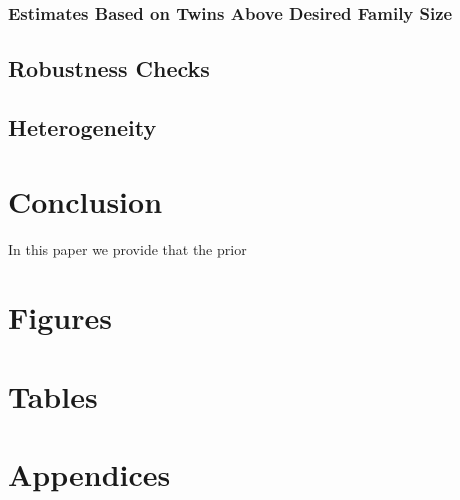 \documentclass{article}[12pt,subeqn]
\begin{document}
\begin{spacing}{1.5}
\subsubsection{Estimates Based on Twins Above Desired Family Size}
\subsection{Robustness Checks}
\subsection{Heterogeneity}

\section{Conclusion}
\label{scn:conclusion}
In this paper we provide  that the prior

\newpage


\newpage
\section*{Figures}


\newpage
\section*{Tables}


\newpage
\section*{Appendices}
\appendix


\end{spacing}
\end{document}
